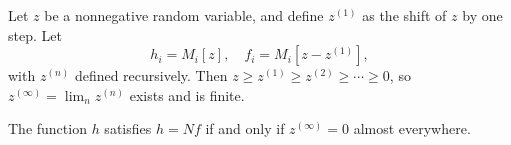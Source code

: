 Let $z$ be a nonnegative random variable, and define $z^{(1)}$ as the shift of $z$ by one step. Let
$$h_i = M_i[z], \quad f_i = M_i[z - z^{(1)}],$$
with $z^{(n)}$ defined recursively. Then $z \geq z^{(1)} \geq z^{(2)} \geq \cdots \geq 0$, so $z^{(\infty)} = \lim_n z^{(n)}$ exists and is finite.

The function $h$ satisfies $h = Nf$ if and only if $z^{(\infty)} = 0$ almost everywhere.
